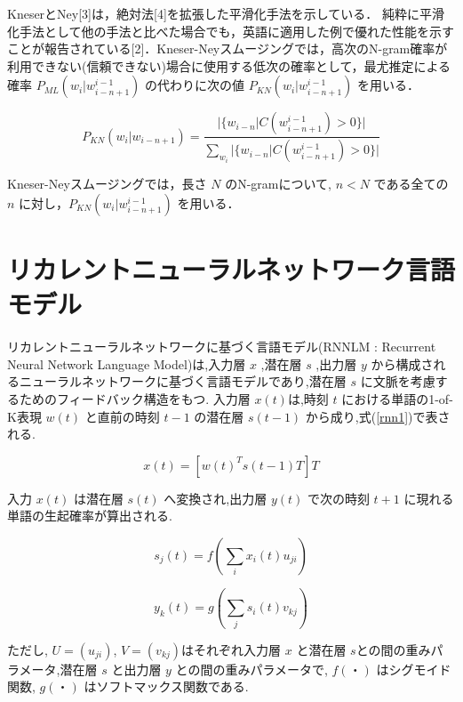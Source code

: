 
KneserとNey[3]は，絶対法[4]を拡張した平滑化手法を示している．
純粋に平滑化手法として他の手法と比べた場合でも，英語に適用した例で優れた性能を示すことが報告されている[2]．Kneser-Neyスムージングでは，高次のN-gram確率が利用できない(信頼できない)場合に使用する低次の確率として，最尤推定による確率 $P_{ML} (w_i|w_{i-n+1}^{i-1})$ の代わりに次の値 $P_{KN} (w_i|w_{i-n+1}^{i-1})$ を用いる．

\begin{equation}
		P_{KN} (w_i|w_{i-n+1}) = \frac{|\{w_{i-n}|C(w_{i-n+1}^{i-1}) > 0\}|}{\sum_{w_i} |\{w_{i-n}|C(w_{i-n+1}^{i-1}) > 0\}|} 
    \label{ngram_smoosing2}
\end{equation}

Kneser-Neyスムージングでは，長さ $N$ のN-gramについて, $n  <  N$ である全ての $n$ に対し，$P_{KN} (w_i|w_{i-n+1}^{i-1})$ を用いる．

\section{リカレントニューラルネットワーク言語モデル}
リカレントニューラルネットワークに基づく言語モデル(RNNLM : Recurrent Neural Network Language Model)は,入力層 $x$ ,潜在層 $s$ ,出力層 $y$ から構成されるニューラルネットワークに基づく言語モデルであり,潜在層 $s$ に文脈を考慮するためのフィードバック構造をもつ. 入力層 $x(t)$は,時刻 $t$ における単語の1-of-K表現 $w(t)$ と直前の時刻 $t−1$
の潜在層 $s(t−1)$ から成り,式(\ref{rnn1})で表される.

\begin{equation}
		x(t) = [w(t)^T s(t-1)T]T
    \label{rnn1}
\end{equation}

入力 $x(t)$ は潜在層 $s(t)$ へ変換され,出力層 $y(t)$ で次の時刻 $t+1$ に現れる単語の生起確率が算出される.

\begin{equation}
		s_j(t) = f(\sum_i x_i(t) u_{ji})
    \label{rnn2}
\end{equation}

\begin{equation}
		y_k(t) = g(\sum_j s_i(t) v_{kj})
    \label{rnn3}
\end{equation}

ただし, $U=(u_{ji})$, $V=(v_{kj})$はそれぞれ入力層 $x$ と潜在層 $s$との間の重みパラメータ,潜在層 $s$
と出力層 $y$ との間の重みパラメータで, $f(・)$ はシグモイド関数, $g(・)$ はソフトマックス関数である.

